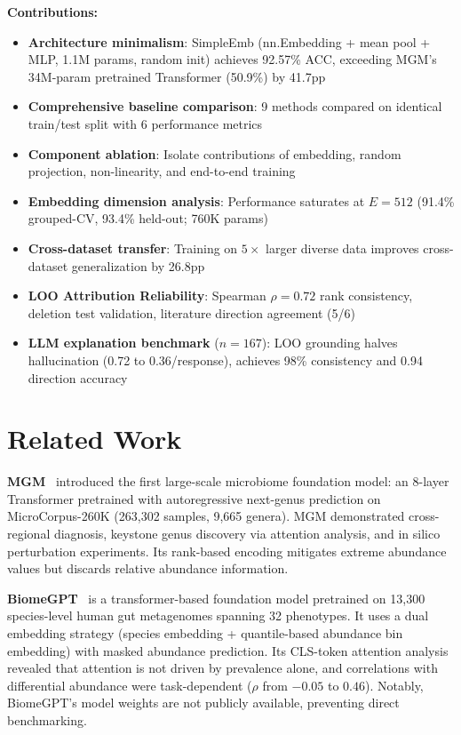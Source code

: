 \documentclass[11pt,a4paper]{article}
\begin{document}
\textbf{Contributions:}
\begin{itemize}
  \item \textbf{Architecture minimalism}: SimpleEmb (nn.Embedding + mean pool + MLP, 1.1M params, random init) achieves 92.57\% ACC, exceeding MGM's 34M-param pretrained Transformer (50.9\%) by 41.7pp
  \item \textbf{Comprehensive baseline comparison}: 9 methods compared on identical train/test split with 6 performance metrics
  \item \textbf{Component ablation}: Isolate contributions of embedding, random projection, non-linearity, and end-to-end training
  \item \textbf{Embedding dimension analysis}: Performance saturates at $E{=}512$ (91.4\% grouped-CV, 93.4\% held-out; 760K params)
  \item \textbf{Cross-dataset transfer}: Training on $5\times$ larger diverse data improves cross-dataset generalization by 26.8pp
  \item \textbf{LOO Attribution Reliability}: Spearman $\rho{=}0.72$ rank consistency, deletion test validation, literature direction agreement (5/6)
  \item \textbf{LLM explanation benchmark} ($n{=}167$): LOO grounding halves hallucination (0.72 to 0.36/response), achieves 98\% consistency and 0.94 direction accuracy
\end{itemize}

\section{Related Work}

\textbf{MGM}~\cite{mgm2024} introduced the first large-scale microbiome foundation model: an 8-layer Transformer pretrained with autoregressive next-genus prediction on MicroCorpus-260K (263,302 samples, 9,665 genera). MGM demonstrated cross-regional diagnosis, keystone genus discovery via attention analysis, and in silico perturbation experiments. Its rank-based encoding mitigates extreme abundance values but discards relative abundance information.

\textbf{BiomeGPT}~\cite{biomegpt2026} is a transformer-based foundation model pretrained on 13,300 species-level human gut metagenomes spanning 32 phenotypes. It uses a dual embedding strategy (species embedding + quantile-based abundance bin embedding) with masked abundance prediction. Its CLS-token attention analysis revealed that attention is not driven by prevalence alone, and correlations with differential abundance were task-dependent ($\rho$ from $-0.05$ to $0.46$). Notably, BiomeGPT's model weights are not publicly available, preventing direct benchmarking.
\end{document}

